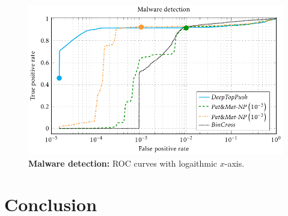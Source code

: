 \begin{figure}
  \centering
  \includegraphics{images/malware_detection.pdf}
  \caption{\textbf{Malware detection:} ROC curves with logaithmic $x$-axis.}
  \label{fig: malware detection}
\end{figure}

\newpage

\section{Conclusion}




